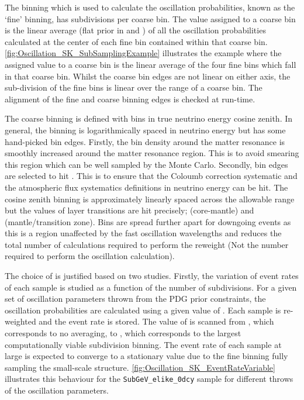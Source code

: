 The binning which is used to calculate the oscillation probabilities, known as the `fine' binning, has  subdivisions per coarse bin. The value assigned to a coarse bin is the linear average (flat prior in  and ) of all the oscillation probabilities calculated at the center of each fine bin contained within that coarse bin. \autoref{fig:Oscillation_SK_SubSamplingExample} illustrates the  example where the assigned value to a coarse bin is the linear average of the four fine bins which fall in that coarse bin. Whilst the coarse bin edges are not linear on either axis, the sub-division of the fine bins is linear over the range of a coarse bin. The alignment of the fine and coarse binning edges is checked at run-time.

The coarse binning is defined with  bins in true neutrino energy \quickmath{\times} cosine zenith. In general, the binning is logarithmically spaced in neutrino energy but has some hand-picked bin edges. Firstly, the bin density around the matter resonance is smoothly increased around the matter resonance region. This is to avoid smearing this region which can be well sampled by the Monte Carlo. Secondly, bin edges are selected to hit . This is to ensure that the Coloumb correction systematic and the atmospheric flux systematics definitions in neutrino energy can be hit. The cosine zenith binning is approximately linearly spaced across the allowable range but the values of layer transitions are hit precisely;  (core-mantle) and  (mantle/transition zone). Bins are spread further apart for downgoing events as this is a region unaffected by the fast oscillation wavelengths and reduces the total number of calculations required to perform the reweight (Not the number required to perform the oscillation calculation).

The choice of  is justified based on two studies. Firstly, the variation of event rates of each sample is studied as a function of the number of subdivisions. For a given set of oscillation parameters thrown from the PDG prior constraints, the oscillation probabilities are calculated using a given value of . Each sample is re-weighted and the event rate is stored. The value of  is scanned from , which corresponds to no averaging, to , which corresponds to the largest computationally viable subdivision binning. The event rate of each sample at large  is expected to converge to a stationary value due to the fine binning fully sampling the small-scale structure. \autoref{fig:Oscillation_SK_EventRateVariable} illustrates this behaviour for the \texttt{SubGeV\_elike\_0dcy} sample for  different throws of the oscillation parameters.


